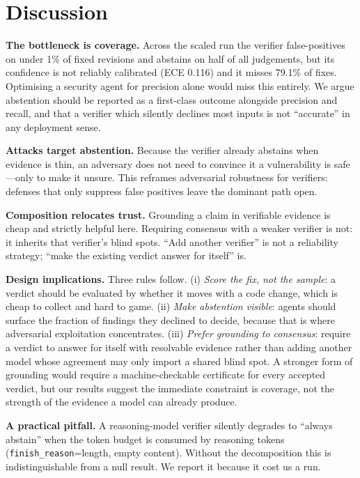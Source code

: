 \documentclass[conference]{IEEEtran}
\newcommand{\code}[1]{\texttt{#1}}
\begin{document}
\section{Discussion}
\textbf{The bottleneck is coverage.} Across the scaled run the verifier
false-positives on under 1\% of fixed revisions and abstains on half of all
judgements, but its confidence is not reliably calibrated (ECE 0.116) and it
misses 79.1\% of fixes. Optimising a security agent for precision alone would
miss this entirely. We argue
abstention should be reported as a first-class outcome alongside precision and
recall, and that a verifier which silently declines most inputs is not ``accurate''
in any deployment sense.

\textbf{Attacks target abstention.} Because the verifier already abstains when
evidence is thin, an adversary does not need to convince it a vulnerability is
safe---only to make it unsure. This reframes adversarial robustness for verifiers:
defenses that only suppress false positives leave the dominant path open.

\textbf{Composition relocates trust.} Grounding a claim in verifiable evidence is
cheap and strictly helpful here. Requiring consensus with a weaker verifier is not:
it inherits that verifier's blind spots. ``Add another verifier'' is not a
reliability strategy; ``make the existing verdict answer for itself'' is.

\textbf{Design implications.} Three rules follow. (i) \emph{Score the fix, not the
sample}: a verdict should be evaluated by whether it moves with a code change, which
is cheap to collect and hard to game. (ii) \emph{Make abstention visible}: agents
should surface the fraction of findings they declined to decide, because that is
where adversarial exploitation concentrates. (iii) \emph{Prefer grounding to
consensus}: require a verdict to answer for itself with resolvable evidence rather
than adding another model whose agreement may only import a shared blind spot. A
stronger form of grounding would require a machine-checkable certificate for every
accepted verdict, but our results suggest the immediate constraint is coverage, not
the strength of the evidence a model can already produce.

\textbf{A practical pitfall.} A reasoning-model verifier silently degrades to
``always abstain'' when the token budget is consumed by reasoning tokens
(\code{finish\_reason}=length, empty content). Without the decomposition this is
indistinguishable from a null result. We report it because it cost us a run.
\end{document}
